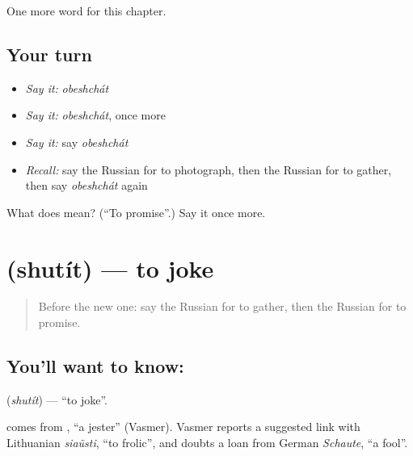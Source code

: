 \begin{grammarlens}[title={What you've built}]
One more word for this chapter.
\end{grammarlens}

\subsection*{Your turn}
\begin{itemize}
\raggedright
  \item \emph{Say it:} \emph{obeshchát}
  \item \emph{Say it:} \emph{obeshchát}, once more
  \item \emph{Say it:} say \emph{obeshchát}
  \item \emph{Recall:} say the Russian for to photograph, then the Russian for to gather, then say \emph{obeshchát} again
\end{itemize}

\begin{tcolorbox}[breakable,colback=teal!4,colframe=teal!35!black,title={Before you move on}]
What does  mean? (\textquotedblleft{}To promise\textquotedblright{}.) Say it once more.
\end{tcolorbox}
\section[\texorpdfstring{\ru{шутить} (shutít)}{шутить (shutít)}]{ (shutít) — to joke}

\label{lesson:RU-C209-shutit}



\begin{quote}
Before the new one: say the Russian for to gather, then the Russian for to promise.
\end{quote}

\subsection*{You'll want to know: }
\textbf{} (\emph{shutít}) — \textquotedblleft{}to joke\textquotedblright{}.

\begin{cousinweb}
\textbf{} comes from \emph{}, \textquotedblleft{}a jester\textquotedblright{} (Vasmer). Vasmer reports a suggested link with Lithuanian \emph{siaũsti}, \textquotedblleft{}to frolic\textquotedblright{}, and doubts a loan from German \emph{Schaute}, \textquotedblleft{}a fool\textquotedblright{}.
\end{cousinweb}

